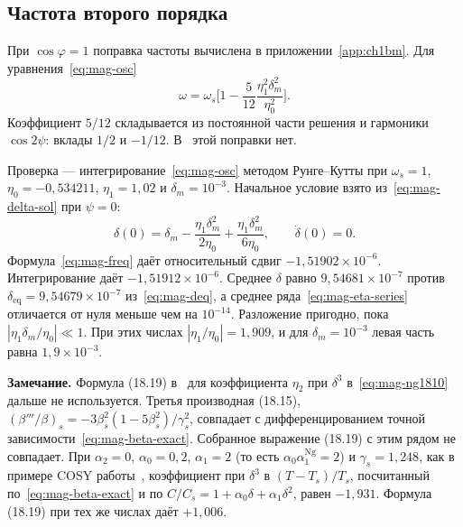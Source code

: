 \subsection{Частота второго порядка}
\label{sec:frequency}

При $\cos\varphi=1$ поправка частоты вычислена в приложении~\ref{app:ch1bm}. Для уравнения~\eqref{eq:mag-osc}
\begin{equation}
\label{eq:mag-freq}
\omega
=\omega_s\Biggl[1-\frac{5}{12}\frac{\eta_1^2\delta_m^2}{\eta_0^2}\Biggr].
\end{equation}
Коэффициент $5/12$ складывается из постоянной части решения и гармоники $\cos 2\psi$: вклады $1/2$ и $-1/12$. В~\cite{Senichev2013} этой поправки нет.

Проверка --- интегрирование~\eqref{eq:mag-osc} методом Рунге--Кутты при $\omega_s=1$, $\eta_0=-0{,}534211$, $\eta_1=1{,}02$ и $\delta_m=10^{-3}$. Начальное условие взято из~\eqref{eq:mag-delta-sol} при $\psi=0$:
\begin{equation}
\label{eq:mag-ic}
\delta(0)
=\delta_m-\frac{\eta_1\delta_m^2}{2\eta_0}+\frac{\eta_1\delta_m^2}{6\eta_0},
\qquad
\dot\delta(0)=0.
\end{equation}
Формула~\eqref{eq:mag-freq} даёт относительный сдвиг $-1{,}51902\times 10^{-6}$. Интегрирование даёт $-1{,}51912\times 10^{-6}$. Среднее $\delta$ равно $9{,}54681\times 10^{-7}$ против $\delta_{\mathrm{eq}}=9{,}54679\times 10^{-7}$ из~\eqref{eq:mag-deq}, а среднее ряда~\eqref{eq:mag-eta-series} отличается от нуля меньше чем на $10^{-14}$. Разложение пригодно, пока $|\eta_1\delta_m/\eta_0|\ll 1$. При этих числах $|\eta_1/\eta_0|=1{,}909$, и для $\delta_m=10^{-3}$ левая часть равна $1{,}9\times 10^{-3}$.

\medskip
\noindent\textbf{Замечание.}
Формула (18.19) в~\cite{Ng2006} для коэффициента $\eta_2$ при $\delta^3$ в~\eqref{eq:mag-ng1810} дальше не используется. Третья производная (18.15), $(\beta'''/\beta)_s=-3\beta_s^2(1-5\beta_s^2)/\gamma_s^2$, совпадает с дифференцированием точной зависимости~\eqref{eq:mag-beta-exact}. Собранное выражение (18.19) с этим рядом не совпадает. При $\alpha_2=0$, $\alpha_0=0{,}2$, $\alpha_1=2$ (то есть $\alpha_0\alpha_1^{\mathrm{Ng}}=2$) и $\gamma_s=1{,}248$, как в примере COSY работы~\cite{Senichev2013}, коэффициент при $\delta^3$ в $(T-T_s)/T_s$, посчитанный по~\eqref{eq:mag-beta-exact} и по $C/C_s=1+\alpha_0\delta+\alpha_1\delta^2$, равен $-1{,}931$. Формула (18.19) при тех же числах даёт $+1{,}006$.

